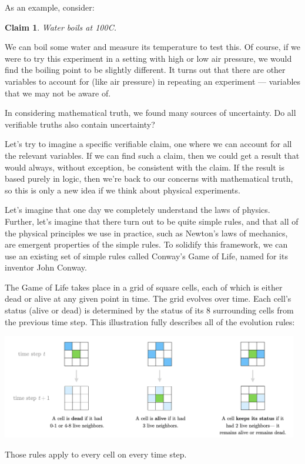 \documentclass[11pt, oneside]{article}
\newtheorem*{claim}{Claim}
\theoremstyle{argtstyle}
\begin{document}
As an example, consider:
\begin{claim}
    Water boils at 100\/\degree C.
\end{claim}
We can boil some water and measure its temperature to test this.
Of course,
if we were to try this experiment in a setting with high or low air pressure, we
would find the boiling point to be slightly different.
It turns out that
there are other variables to account for (like air pressure)
in repeating an experiment ---
variables that we may not be aware of.

In considering mathematical truth, we found many sources of uncertainty.
Do all verifiable truths also contain uncertainty?

Let's try to imagine a specific verifiable claim, one where we can
account for all the relevant variables. If we can find such a claim, then we
could get a result that would always, without exception, be
consistent with the claim.
If the result is based purely in logic, then we're
back to our concerns with mathematical truth, so this is only a new idea if we
think about physical experiments.

Let's imagine that one day we completely understand the laws of physics.
Further, let's imagine that there turn out to be quite simple rules, and that
all of the physical principles we use in practice, such as Newton's laws of
mechanics, are emergent properties of the simple rules.
To solidify this framework, we can use an existing set of simple rules
called Conway's Game of Life, named for its inventor John Conway.

The Game of Life takes place in a grid of square cells, each of which is either
dead or alive at any given point in time. The grid evolves over
time. Each cell's status (alive or dead) is determined by the status of its 8
surrounding cells from the previous time step. This illustration fully
describes all of the evolution rules:
\begin{center}
\includegraphics[width=13cm]{gameoflife.png}
\end{center}
Those rules apply to every cell on every time step.
\end{document}
